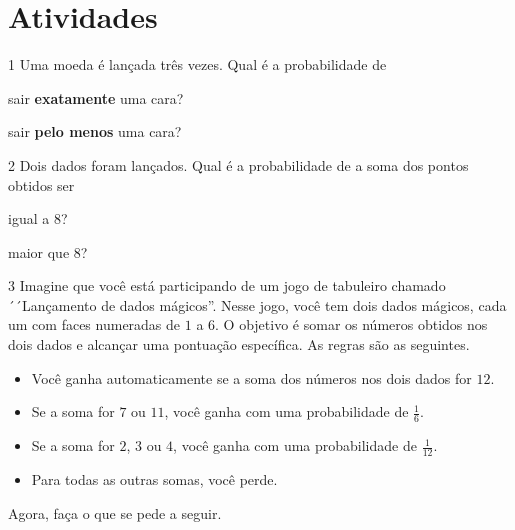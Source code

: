 \section*{Atividades}

\num{1}  Uma moeda é lançada três vezes. Qual é a probabilidade de

\begin{escolha}
\item sair \textbf{exatamente} uma cara?\\

\item sair \textbf{pelo menos} uma cara?\\
\end{escolha}

\num{2}  Dois dados foram lançados. Qual é a probabilidade de a soma dos
pontos obtidos ser

\begin{escolha}
\item igual a 8?\\

\item maior que 8?\\
\end{escolha}

\num{3} Imagine que você está participando de um jogo de tabuleiro chamado
´´Lançamento de dados mágicos''. Nesse jogo, você tem dois dados mágicos,
cada um com faces numeradas de $1$ a $6$. O objetivo é somar os números
obtidos nos dois dados e alcançar uma pontuação específica. As regras são
as seguintes.

\begin{itemize}
   \item Você ganha automaticamente se a soma dos números nos dois dados for $12$.
   \item Se a soma for $7$ ou $11$, você ganha com uma probabilidade de $\frac{1}{6}$.
   \item Se a soma for $2$, $3$ ou $4$, você ganha com uma probabilidade de $\frac{1}{12}$.
   \item Para todas as outras somas, você perde.
\end{itemize}

Agora, faça o que se pede a seguir.

